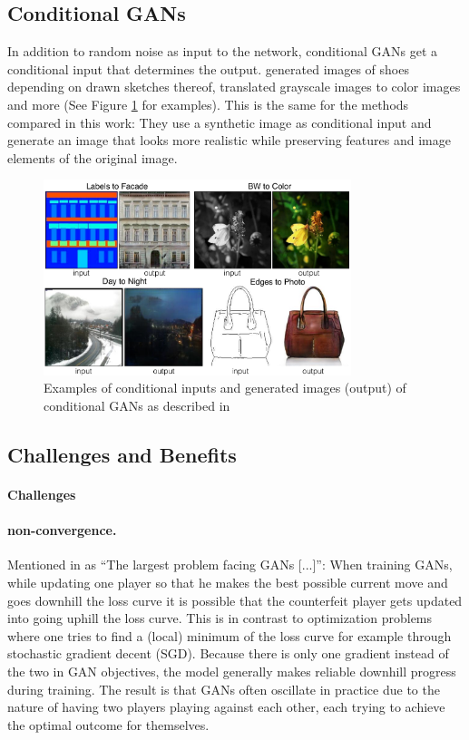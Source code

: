 \subsection{Conditional GANs}
In addition to random noise as input to the network, conditional GANs get a conditional input that determines the output. \cite{DBLP:journals/corr/IsolaZZE16} generated images of shoes depending on drawn sketches thereof, translated grayscale images to color images and more (See Figure \ref{fig:I2I_examples} for examples). This is the same for the methods compared in this work: They use a synthetic image as conditional input and generate an image that looks more realistic while preserving features and image elements of the original image.

\begin{figure}
	\centering
	\includegraphics[width=0.8\textwidth]{../images/I2I_examples.png}
	\caption{Examples of conditional inputs and generated images (output) of conditional GANs as described in \cite{DBLP:journals/corr/IsolaZZE16}}
	\label{fig:I2I_examples}
\end{figure}

\newpage

\subsection{Challenges and Benefits}
\paragraph{Challenges}
\paragraph{non-convergence.} Mentioned in \cite{DBLP:journals/corr/Goodfellow17} as ``The largest problem facing GANs [...]'': When training GANs, while updating one player so that he makes the best possible current move and goes downhill the loss curve it is possible that the counterfeit player gets updated into going uphill the loss curve. This is in contrast to optimization problems where one tries to find a (local) minimum of the loss curve for example through stochastic gradient decent (SGD). Because there is only one gradient instead of the two in GAN objectives, the model generally makes reliable downhill progress during training. The result is that GANs often oscillate in practice due to the nature of having two players playing against each other, each trying to achieve the optimal outcome for themselves. 

